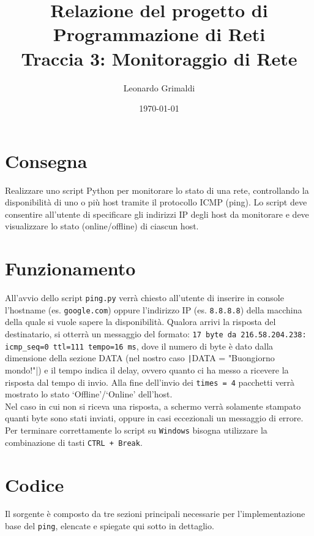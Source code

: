 \documentclass[a4paper,12pt]{report}
\title{Relazione del progetto di Programmazione di Reti 
    \\ Traccia 3: Monitoraggio di Rete}
\author{Leonardo Grimaldi}
\date{\today}
\begin{document}
\maketitle
\tableofcontents
\chapter{Consegna}
Realizzare uno script Python per monitorare lo stato di una rete, controllando la disponibilità di uno o più host tramite il protocollo ICMP (ping).
%
Lo script deve consentire all'utente di specificare gli indirizzi IP degli host da monitorare e deve visualizzare lo stato (online/offline) di ciascun host.
\chapter{Funzionamento}
All'avvio dello script \texttt{ping.py} verrà chiesto all'utente di inserire in console l'hostname (es. \texttt{google.com}) oppure l'indirizzo IP (es. \texttt{8.8.8.8}) della macchina della quale si vuole sapere la disponibilità.
%
Qualora arrivi la risposta del destinatario, si otterrà un messaggio del formato: \texttt{17 byte da 216.58.204.238: icmp\_seq=0 ttl=111 tempo=16 ms}, dove il numero di byte è dato dalla dimensione della sezione DATA (nel nostro caso \texttt|DATA = "Buongiorno mondo!"|) e il tempo indica il delay, ovvero quanto ci ha messo a ricevere la risposta dal tempo di invio.
%
Alla fine dell'invio dei \texttt{times = 4} pacchetti verrà mostrato lo stato `Offline'/`Online' dell'host.
%
\\ Nel caso in cui non si riceva una risposta, a schermo verrà solamente stampato quanti byte sono stati inviati, oppure in casi eccezionali un messaggio di errore.
%
Per terminare correttamente lo script su \texttt{Windows} bisogna utilizzare la combinazione di tasti \texttt{CTRL + Break}.
\chapter{Codice}
Il sorgente è composto da tre sezioni principali necessarie per l'implementazione base del \texttt{ping}, elencate e spiegate qui sotto in dettaglio.
\end{document}
